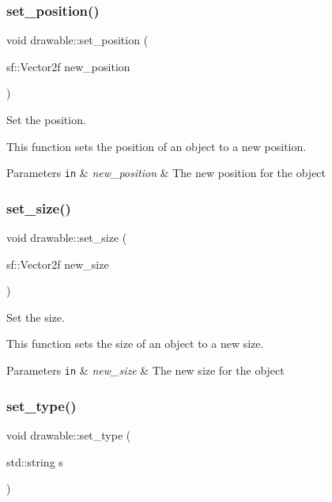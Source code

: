 \subsubsection{\texorpdfstring{set\+\_\+position()}{set\_position()}}
{\footnotesize\ttfamily void drawable\+::set\+\_\+position (\begin{DoxyParamCaption}\item[{sf\+::\+Vector2f}]{new\+\_\+position }\end{DoxyParamCaption})}



Set the position. 

This function sets the position of an object to a new position.


\begin{DoxyParams}[1]{Parameters}
\mbox{\tt in}  & {\em new\+\_\+position} & The new position for the object \\
\hline
\end{DoxyParams}
\mbox{\label{classdrawable_a34b6b50f342c41f550f09e0465f95f61}} 
\subsubsection{\texorpdfstring{set\+\_\+size()}{set\_size()}}
{\footnotesize\ttfamily void drawable\+::set\+\_\+size (\begin{DoxyParamCaption}\item[{sf\+::\+Vector2f}]{new\+\_\+size }\end{DoxyParamCaption})}



Set the size. 

This function sets the size of an object to a new size.


\begin{DoxyParams}[1]{Parameters}
\mbox{\tt in}  & {\em new\+\_\+size} & The new size for the object \\
\hline
\end{DoxyParams}
\mbox{\label{classdrawable_aa019787b726542ca470fb817251e7b09}} 
\subsubsection{\texorpdfstring{set\+\_\+type()}{set\_type()}}
{\footnotesize\ttfamily void drawable\+::set\+\_\+type (\begin{DoxyParamCaption}\item[{std\+::string}]{s }\end{DoxyParamCaption})}



